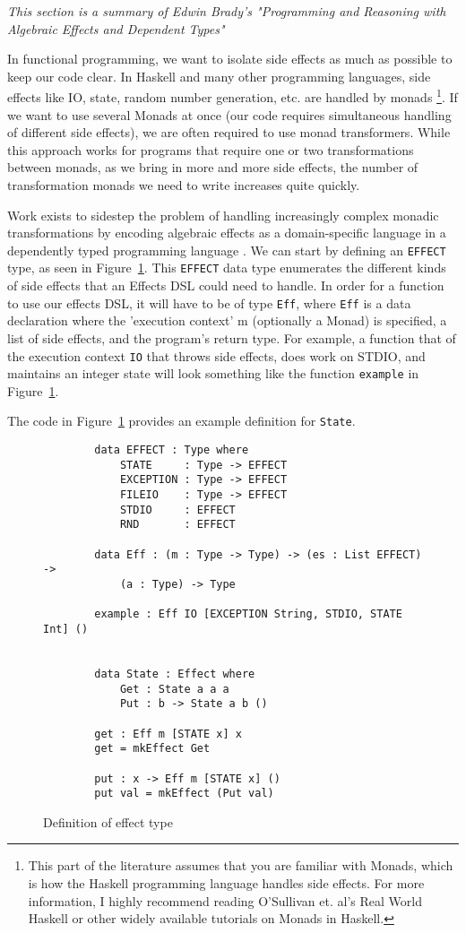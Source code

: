 \textit{This section is a summary of Edwin Brady's "Programming and Reasoning
with Algebraic Effects and Dependent Types" \cite{algebraic}}

In functional programming, we want to isolate side effects as much as possible
to keep our code clear. In Haskell and many other programming languages, side
effects like IO, state, random number generation, etc. are handled by monads
\cite{realworldhaskell}\footnote{This part of the literature assumes that you
are familiar with Monads, which is how the Haskell programming language handles
side effects. For more information, I highly recommend reading O'Sullivan et.
al's Real World Haskell or other widely available tutorials on Monads in
Haskell.}. If we want to use several Monads at once (our code requires
simultaneous handling of different side effects), we are often required to use
monad transformers. While this approach works for programs that require one or
two transformations between monads, as we bring in more and more side effects,
the number of transformation monads we need to write increases quite quickly. 

Work exists to sidestep the problem of handling increasingly complex monadic
transformations by encoding algebraic effects as a domain-specific language in a
dependently typed programming language \cite{algebraic}. We can start by
defining an \texttt{EFFECT} type, as seen in Figure~\ref{effects_def}. This
\texttt{EFFECT} data type enumerates the different kinds of side effects that an
Effects DSL could need to handle. In order for a function to use our effects
DSL, it will have to be of type \texttt{Eff}, where \texttt{Eff} is a data
declaration where the 'execution context' m (optionally a Monad) is specified, a
list of side effects, and the program's return type. For example, a function
that of the execution context \texttt{IO} that throws side effects, does work on
STDIO, and maintains an integer state will look something like the function
\texttt{example} in Figure~\ref{effects_def}. 

The code in Figure~\ref{effects_def} provides an example definition for
\texttt{State}. 

\begin{figure}[ht!!!!]
    \caption{Definition of effect type}
    \label{effects_def}
    \begin{lstlisting}
        data EFFECT : Type where
            STATE     : Type -> EFFECT
            EXCEPTION : Type -> EFFECT
            FILEIO    : Type -> EFFECT
            STDIO     : EFFECT
            RND       : EFFECT
        
        data Eff : (m : Type -> Type) -> (es : List EFFECT) -> 
            (a : Type) -> Type
    
        example : Eff IO [EXCEPTION String, STDIO, STATE Int] ()


        data State : Effect where
            Get : State a a a
            Put : b -> State a b ()

        get : Eff m [STATE x] x
        get = mkEffect Get

        put : x -> Eff m [STATE x] ()
        put val = mkEffect (Put val)
    \end{lstlisting}
\end{figure}

